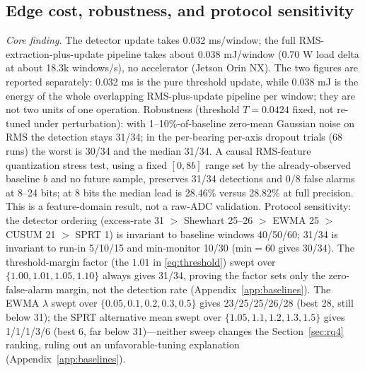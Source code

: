 \documentclass[journal]{IEEEtran}
\begin{document}
\subsection{Edge cost, robustness, and protocol sensitivity}\label{sec:robustness}
\emph{Core finding.} The detector update takes 0.032 ms/window; the full RMS-extraction-plus-update pipeline takes about 0.038 mJ/window (0.70 W load delta at about 18.3k windows/s), no accelerator (Jetson Orin NX). The two figures are reported separately: 0.032 ms is the pure threshold update, while 0.038 mJ is the energy of the whole overlapping RMS-plus-update pipeline per window; they are not two units of one operation. Robustness (threshold $T=0.0424$ fixed, not re-tuned under perturbation): with 1--10\%-of-baseline zero-mean Gaussian noise on RMS the detection stays 31/34; in the per-bearing per-axis dropout trials (68 runs) the worst is 30/34 and the median 31/34. A causal RMS-feature quantization stress test, using a fixed $[0,8b]$ range set by the already-observed baseline $b$ and no future sample, preserves 31/34 detections and 0/8 false alarms at 8--24 bits; at 8 bits the median lead is 28.46\% versus 28.82\% at full precision. This is a feature-domain result, not a raw-ADC validation. Protocol sensitivity: the detector ordering (excess-rate 31 $>$ Shewhart 25--26 $>$ EWMA 25 $>$ CUSUM 21 $>$ SPRT 1) is invariant to baseline windows 40/50/60; 31/34 is invariant to run-in 5/10/15 and min-monitor 10/30 (min$=$60 gives 30/34). The threshold-margin factor (the $1.01$ in \eqref{eq:threshold}) swept over $\{1.00,1.01,1.05,1.10\}$ always gives 31/34, proving the factor sets only the zero-false-alarm margin, not the detection rate (Appendix~\ref{app:baselines}). The EWMA $\lambda$ swept over $\{0.05,0.1,0.2,0.3,0.5\}$ gives 23/25/25/26/28 (best 28, still below 31); the SPRT alternative mean swept over $\{1.05,1.1,1.2,1.3,1.5\}$ gives 1/1/1/3/6 (best 6, far below 31)---neither sweep changes the Section~\ref{sec:rq4} ranking, ruling out an unfavorable-tuning explanation (Appendix~\ref{app:baselines}).
\end{document}
